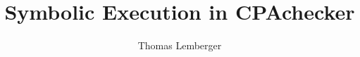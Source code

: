 \documentclass{acm_proc_article-sp}
\begin{document}
\title{Symbolic Execution in CPAchecker}
\subtitle{}
\author{
  \alignauthor
  Thomas Lemberger
}
\maketitle

%







\end{document}
